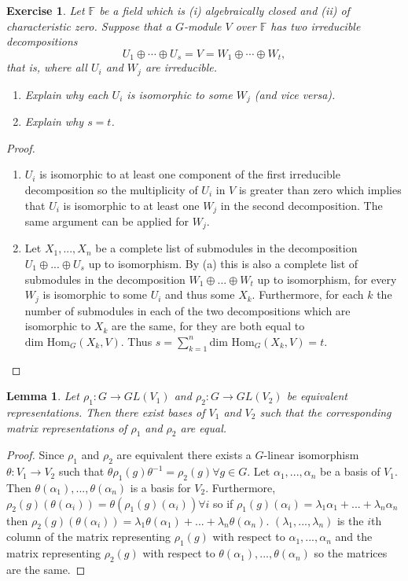 \documentclass{article}
\newtheorem{lemma}[theorem]{Lemma}
\newtheorem{exercise}[theorem]{Exercise}
\begin{document}
\begin{exercise}
Let $\mathbb{F}$ be a field which is (i) algebraically closed and (ii) of characteristic zero. Suppose that a $G$-module $V$ over $\mathbb{F}$ has two irreducible decompositions
\[
U_1 \oplus \cdots \oplus U_s = V = W_1 \oplus \cdots \oplus W_t,
\]
that is, where all $U_i$ and $W_j$ are irreducible.

\begin{enumerate}
    \item[(a)] Explain why each $U_i$ is isomorphic to some $W_j$ (and vice versa).
    \item[(b)] Explain why $s = t$.
\end{enumerate}
\end{exercise}
\begin{proof}
\begin{enumerate}
    \item[(a)] $U_i$ is isomorphic to at least one component of the first irreducible decomposition so the multiplicity of $U_i$ in $V$ is greater than zero which implies that $U_i$ is isomorphic to at least one $W_j$ in the second decomposition. The same argument can be applied for $W_j$.
    \item[(b)] Let $X_1,...,X_n$ be a complete list of submodules in the decomposition $U_1\oplus...\oplus U_s$ up to isomorphism. By (a) this is also a complete list of submodules in the decomposition $W_1\oplus...\oplus W_t$ up to isomorphism, for every $W_j$ is isomorphic to some $U_i$ and thus some $X_k$. Furthermore, for each $k$ the number of submodules in each of the two decompositions which are isomorphic to $X_k$ are the same, for they are both equal to $\text{dim Hom}_G(X_k,V)$. Thus $s=\sum_{k=1}^n\text{dim Hom}_G(X_k,V)=t$.
\end{enumerate}
\end{proof}

\begin{lemma}
Let $\rho_1:G\to GL(V_1)$ and $\rho_2:G\to GL(V_2)$ be equivalent representations. Then there exist bases of $V_1$ and $V_2$ such that the corresponding matrix representations of $\rho_1$ and $\rho_2$ are equal.
\end{lemma}
\begin{proof}
Since $\rho_1$ and $\rho_2$ are equivalent there exists a $G$-linear isomorphism $\theta:V_1\to V_2$ such that $\theta\rho_1(g)\theta^{-1}=\rho_2(g)\forall g\in G$. Let $\alpha_1,...,\alpha_n$ be a basis of $V_1$. Then $\theta(\alpha_1),...,\theta(\alpha_n)$ is a basis for $V_2$. Furthermore, $\rho_2(g)(\theta(\alpha_i))=\theta(\rho_1(g)(\alpha_i))\forall i$ so if $\rho_1(g)(\alpha_i)=\lambda_1\alpha_1+...+\lambda_n\alpha_n$ then $\rho_2(g)(\theta(\alpha_i))=\lambda_1\theta(\alpha_1)+...+\lambda_n\theta(\alpha_n)$. $(\lambda_1,...,\lambda_n)$ is the $i$th column of the matrix representing $\rho_1(g)$ with respect to $\alpha_1,...,\alpha_n$ and the matrix representing $\rho_2(g)$ with respect to $\theta(\alpha_1),...,\theta(\alpha_n)$ so the matrices are the same.
\end{proof}
\end{document}
